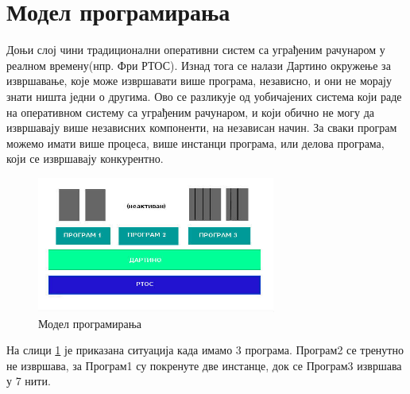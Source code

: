 \documentclass[12pt,oneside]{memoir}
\begin{document}
\section{Модел програмирања}

Доњи слој чини традиционални оперативни систем са уграђеним рачунаром у реалном времену(нпр. Фри РТОС). Изнад тога се налази Дартино окружење за извршавање, које може извршавати више програма, независно, и они не морају знати ништа једни о другима. Ово се разликује од уобичајених система који раде на оперативном систему са уграђеним рачунаром, и који обично не могу да извршавају више независних компоненти, на независан начин. За сваки програм можемо имати више процеса, више инстанци програма, или делова програма, који се извршавају конкурентно.

\begin{figure}[!ht]
  \centering
  \includegraphics[width=0.7\textwidth]{arhitektura.jpg}
  \caption{Модел програмирања}
  \label{fig:model}
\end{figure}
На слици \ref{fig:model} је приказана ситуација када имамо 3 програма. Програм2 се тренутно не извршава, за Програм1 су покренуте две инстанце, док се Програм3  извршава у 7 нити.
\end{document}
